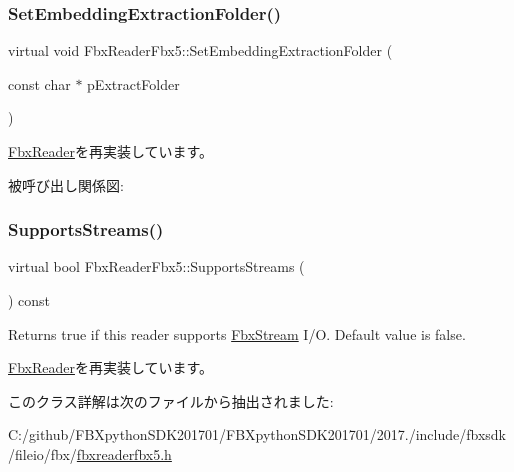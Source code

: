 \subsubsection{\texorpdfstring{Set\+Embedding\+Extraction\+Folder()}{SetEmbeddingExtractionFolder()}}
{\footnotesize\ttfamily virtual void Fbx\+Reader\+Fbx5\+::\+Set\+Embedding\+Extraction\+Folder (\begin{DoxyParamCaption}\item[{const char $\ast$}]{p\+Extract\+Folder }\end{DoxyParamCaption})\hspace{0.3cm}{\ttfamily [virtual]}}



\hyperlink{class_fbx_reader_a640eef510ddb298b2eaad0545b79de66}{Fbx\+Reader}を再実装しています。

被呼び出し関係図\+:
\mbox{\label{class_fbx_reader_fbx5_ae6f619a41303077d9d4ed2935f3d2108}} 
\subsubsection{\texorpdfstring{Supports\+Streams()}{SupportsStreams()}}
{\footnotesize\ttfamily virtual bool Fbx\+Reader\+Fbx5\+::\+Supports\+Streams (\begin{DoxyParamCaption}{ }\end{DoxyParamCaption}) const\hspace{0.3cm}{\ttfamily [virtual]}}

Returns true if this reader supports \hyperlink{class_fbx_stream}{Fbx\+Stream} I/O. Default value is false. 

\hyperlink{class_fbx_reader_ab08a9e71a059ef6052e7fe2d8ba6c35d}{Fbx\+Reader}を再実装しています。



このクラス詳解は次のファイルから抽出されました\+:\begin{DoxyCompactItemize}
\item 
C\+:/github/\+F\+B\+Xpython\+S\+D\+K201701/\+F\+B\+Xpython\+S\+D\+K201701/2017./include/fbxsdk/fileio/fbx/\hyperlink{fbxreaderfbx5_8h}{fbxreaderfbx5.\+h}\end{DoxyCompactItemize}
